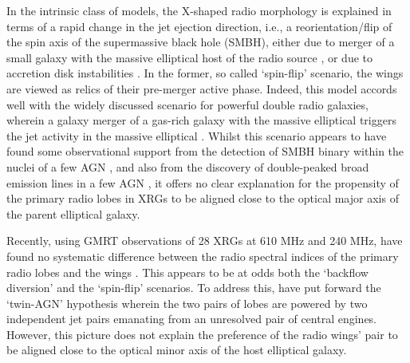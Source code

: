 \documentclass[twocolumn]{aastex62}
\begin{document}
In the intrinsic class of models, the X-shaped radio morphology is
explained in terms of a rapid change in the jet ejection direction, 
i.e., a reorientation/flip of the spin axis of the supermassive black 
hole (SMBH), either due to merger of a small galaxy with the massive
elliptical host of the radio source
\citep{Zier2001A&A...377...23Z,Merritt2002Sci...297.1310M,Rottmann2001PhDT.......173R,Zier2002A&A...396...91Z},
or due to accretion disk instabilities \citep{Dennett2002MNRAS.330..609D}. 
In the former, so called `spin-flip' scenario, the wings are viewed as 
relics of their pre-merger active phase. Indeed, this model accords well 
with the widely discussed scenario for powerful double radio galaxies,
wherein a galaxy merger of a gas-rich galaxy with the massive elliptical 
triggers the jet activity in the massive elliptical 
\citep{Begelman1984RvMP...56..255B,Wilson1995ApJ...438...62W}. 
Whilst this scenario appears to have found some observational support 
from the detection of SMBH binary within the nuclei of a few AGN
\citep{Rodriguez2006ApJ...646...49R,Kharb2017NatAs...1..727K}, 
and also from the discovery of double-peaked broad emission lines in a 
few AGN \citep{Zhang2007MNRAS.377.1215Z, Rubinur2019MNRAS.484.4933R}, 
it offers no clear explanation for the propensity of the primary radio
lobes in XRGs to be aligned close to the optical major axis of the
parent elliptical galaxy.


Recently, using GMRT observations of 28 XRGs at 610 MHz and 240 MHz,
\citet{Lal2019arXiv190311632L} have found no systematic difference
between the radio spectral indices of the primary radio lobes and the
wings \citep[see also,][]{Lal2005MNRAS.356..232L,Lal2007MNRAS.374.1085L}. 
This appears to be at odds both the `backflow diversion' and the `spin-flip' 
scenarios. To address this, \citet[][]{Lal2005MNRAS.356..232L,Lal2007MNRAS.374.1085L} 
have put forward the `twin-AGN' hypothesis wherein the two pairs of 
lobes are powered by two independent jet pairs emanating from an 
unresolved pair of central engines. However, this picture does not 
explain the preference of the radio wings' pair to be aligned close to 
the optical minor axis of the host elliptical galaxy.
\end{document}
